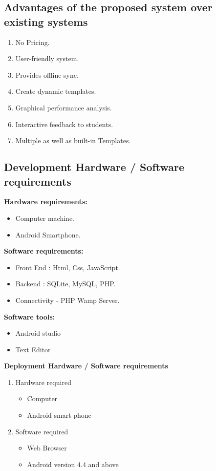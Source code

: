 \subsection{Advantages of the proposed system over existing systems}
\begin{enumerate}
    \item No Pricing.
    \item User-friendly system.
    \item Provides offline sync.
    \item Create dynamic templates.
    \item Graphical performance analysis.
    \item Interactive feedback to students.
    \item Multiple as well as built-in Templates.  
\end{enumerate}

\subsection{Development Hardware / Software requirements}

\textbf{Hardware requirements:}
\begin{itemize}
    \item Computer machine.
    \item Android Smartphone.
\end{itemize}
\textbf{Software requirements:}
\begin{itemize}
    \item Front End : Html, Css, JavaScript.
    \item Backend : SQLite, MySQL, PHP.
    \item Connectivity - PHP Wamp Server.
\end{itemize}
\textbf{Software tools:}
\begin{itemize}
    \item Android studio
    \item Text Editor
\end{itemize}

\textbf{Deployment Hardware / Software requirements}
\begin{enumerate}
\item Hardware required
    \begin{itemize}
        \item Computer
        \item Android smart-phone 
    \end{itemize}
 
\item Software required
    \begin{itemize}
        \item Web Browser        
        \item Android version 4.4 and above
    \end{itemize}
\end{enumerate}

